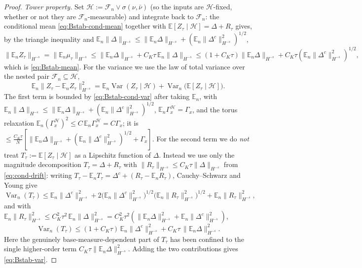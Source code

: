 \documentclass[a4paper,fleqn]{cas-sc}
\theoremstyle{definition}
\theoremstyle{remark}
\begin{document}
\begin{proof}
\emph{Tower property.} Set $\mathcal H:=\mathcal F_n\vee\sigma(\nu,\bar\nu)$ (so the
inputs are $\mathcal H$-fixed, whether or not they are $\mathcal F_n$-measurable) and
integrate back to $\mathcal F_n$: the conditional mean \eqref{eq:Bstab-cond-mean}
together with $\mathbb E[Z_\tau\mid\mathcal H]=\Delta+R_\tau$ gives, by the triangle
inequality and $\mathbb E_n\|\Delta\|_{H^{-s}}\le\|\mathbb E_n\Delta\|_{H^{-s}}
+(\mathbb E_n\|\Delta^c\|_{H^{-s}}^2)^{1/2}$,
\[
\|\mathbb E_nZ_\tau\|_{H^{-s}}=\|\mathbb E_n\mu_\tau\|_{H^{-s}}
\le\|\mathbb E_n\Delta\|_{H^{-s}}+C_K\tau\,\mathbb E_n\|\Delta\|_{H^{-s}}
\le(1+C_K\tau)\|\mathbb E_n\Delta\|_{H^{-s}}+C_K\tau(\mathbb E_n\|\Delta^c\|_{H^{-s}}^2)^{1/2},
\]
which is \eqref{eq:Bstab-mean}. For the variance we use the law of total variance over
the nested pair $\mathcal F_n\subseteq\mathcal H$,
\[
\mathbb E_n\|Z_\tau-\mathbb E_nZ_\tau\|_{H^{-s}}^2
=\mathbb E_n\operatorname{Var}(Z_\tau\mid\mathcal H)
+\operatorname{Var}_n\bigl(\mathbb E[Z_\tau\mid\mathcal H]\bigr).
\]
The first term is bounded by \eqref{eq:Bstab-cond-var} after taking $\mathbb E_n$,
with $\mathbb E_n\|\Delta\|_{H^{-s}}\le\|\mathbb E_n\Delta\|_{H^{-s}}
+(\mathbb E_n\|\Delta^c\|_{H^{-s}}^2)^{1/2}$, $\mathbb E_n\Gamma_x^{\mathcal H}=\Gamma_x$,
and the torus relaxation $\mathbb E_n(\Gamma_x^{\mathcal H})^2\le C\,\mathbb E_n\Gamma_x^{\mathcal H}=C\Gamma_x$;
it is $\le\frac{C_K\tau}{N}[\|\mathbb E_n\Delta\|_{H^{-s}}
+(\mathbb E_n\|\Delta^c\|_{H^{-s}}^2)^{1/2}+\Gamma_x]$. For the second term we do
\emph{not} treat $T_\tau:=\mathbb E[Z_\tau\mid\mathcal H]$ as a Lipschitz function
of $\Delta$. Instead we use only the magnitude decomposition
$T_\tau=\Delta+R_\tau$ with $\|R_\tau\|_{H^{-s}}\le C_K\tau\|\Delta\|_{H^{-s}}$ from
\eqref{eq:cond-drift}: writing $T_\tau-\mathbb E_nT_\tau=\Delta^c+(R_\tau-\mathbb E_nR_\tau)$,
Cauchy--Schwarz and Young give
\[
\operatorname{Var}_n(T_\tau)
\le\mathbb E_n\|\Delta^c\|_{H^{-s}}^2
+2\bigl(\mathbb E_n\|\Delta^c\|_{H^{-s}}^2\bigr)^{1/2}\bigl(\mathbb E_n\|R_\tau\|_{H^{-s}}^2\bigr)^{1/2}
+\mathbb E_n\|R_\tau\|_{H^{-s}}^2,
\]
and with $\mathbb E_n\|R_\tau\|_{H^{-s}}^2\le C_K^2\tau^2\,\mathbb E_n\|\Delta\|_{H^{-s}}^2
=C_K^2\tau^2(\|\mathbb E_n\Delta\|_{H^{-s}}^2+\mathbb E_n\|\Delta^c\|_{H^{-s}}^2)$,
\begin{equation}\label{eq:Ttau-vardecomp}
\operatorname{Var}_n(T_\tau)
\le(1+C_K\tau)\,\mathbb E_n\|\Delta^c\|_{H^{-s}}^2+C_K\tau\,\|\mathbb E_n\Delta\|_{H^{-s}}^2 .
\end{equation}
Here the genuinely base-measure-dependent part of $T_\tau$ has been confined to the
single higher-order term $C_K\tau\|\mathbb E_n\Delta\|_{H^{-s}}^2$. Adding the two
contributions gives \eqref{eq:Bstab-var}.
\end{proof}
\end{document}

